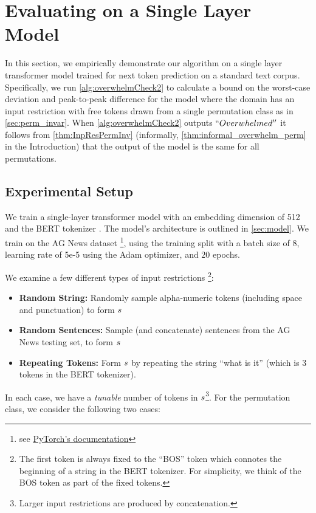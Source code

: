 \section{Evaluating on a Single Layer Model}
\label{sec:model_eval}

In this section, we empirically demonstrate our algorithm on a single layer transformer model trained for next token prediction on a standard text corpus.
Specifically, we run \cref{alg:overwhelmCheck2} to calculate a bound on the worst-case deviation and peak-to-peak difference for the model where the domain has an input restriction with free tokens drawn from a single permutation class as in \cref{sec:perm_invar}. When \cref{alg:overwhelmCheck2} outputs $``Overwhelmed''$ it follows from \cref{thm:InpResPermInv} (informally, \cref{thm:informal_overwhelm_perm} in the Introduction) that the output of the model is the same for all permutations.

\subsection{Experimental Setup}
We train a single-layer transformer model with an embedding dimension of 512 and the BERT tokenizer \cite{devlin-etal-2019-bert}.
The model's architecture is outlined in \cref{sec:model}.
We train on the AG News dataset \footnote{see \href{https://pytorch.org/text/stable/_modules/torchtext/datasets/ag_news.html}{PyTorch's documentation}}, using the training split with a batch size of 8, learning rate of 5e-5 using the Adam optimizer, and $20$ epochs.

We examine a few different types of input restrictions
\footnote{
    The first token is always fixed to the ``BOS'' token which connotes the beginning of a string in the BERT tokenizer. For simplicity, we think of the BOS token as part of the fixed tokens.
}:
\begin{itemize}[nosep]
	\item \textbf{Random String:} Randomly sample alpha-numeric tokens (including space and punctuation) to form ${s}$
	\item \textbf{Random Sentences:} Sample (and concatenate) sentences from the AG News testing set, to form ${s}$
	\item \textbf{Repeating Tokens:} Form ${s}$ by repeating the string ``what is it'' (which is $3$ tokens in the BERT tokenizer).
\end{itemize}

In each case, we have a \emph{tunable} number of tokens in ${s}$\footnote{Larger input restrictions are produced by concatenation.}.
For the permutation class, we consider the following two cases:

